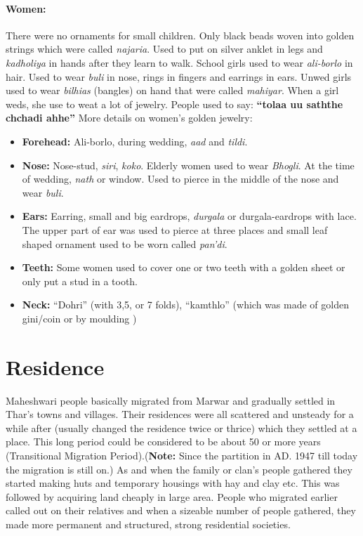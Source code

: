 \paragraph{Women:} There were no ornaments for small children. Only black beads
woven into golden strings which were called \textit{najaria}. Used to put on
silver anklet in legs and \textit{kadholiya} in hands after they learn to walk.
School girls used to wear \textit{ali-borlo} in hair. Used to wear \textit{buli}
in nose, rings in fingers and earrings in ears. Unwed girls used to wear
\textit{bilhias} (bangles) on hand that were called \textit{mahiyar}. When a
girl weds, she use to weat a lot of jewelry. People used to say: \textbf{``tolaa
uu saththe chchadi ahhe''} More details on women's golden jewelry:
\begin{itemize}
 \item \textbf{Forehead:} Ali-borlo, during wedding, \textit{aad} and \textit{tildi}.
\item \textbf{Nose:} Nose-stud, \textit{siri}, \textit{koko}. Elderly women used
to wear \textit{Bhogli}. At the time of wedding, \textit{nath} or window. Used
to pierce in the middle of the nose and wear \textit{buli}.
\item \textbf{Ears:} Earring, small and big eardrops, \textit{durgala} or
durgala-eardrops with lace. The upper part of ear was used to pierce at three
places and small leaf shaped ornament used to be worn called \textit{pan'di}.
\item \textbf{Teeth:} Some women used to cover one or two teeth with a golden
sheet or only put a stud in a tooth.
\item \textbf{Neck:} ``Dohri'' (with 3,5, or 7 folds), ``kamthlo'' (which was
made of golden gini/coin or by moulding )
\end{itemize}

\section{Residence}
Maheshwari people basically migrated from Marwar and gradually settled in Thar's
towns and villages. Their residences were all scattered and unsteady for a while
after (usually changed the residence twice or thrice) which they settled at a
place. This long period could be considered to be about 50 or more years
(Transitional Migration Period).(\textbf{Note:} Since the partition in AD. 1947
till today the migration is still on.) As and when the family or clan's people
gathered they started making huts and temporary housings with hay and clay etc.
This was followed by acquiring land cheaply in large area. People who migrated
earlier called out on their relatives and when a sizeable number of people
gathered, they made more permanent and structured, strong residential societies.

